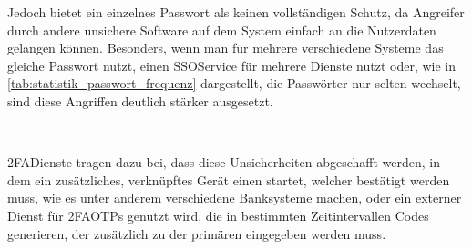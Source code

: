 Jedoch bietet ein einzelnes Passwort als  keinen vollständigen Schutz\autocite[\vglf][]{10.1145/3440712},  da Angreifer \zb durch andere unsichere Software auf dem System einfach an die Nutzerdaten gelangen können.
Besonders, wenn man für mehrere verschiedene Systeme das gleiche Passwort nutzt, einen \ac{SSO}\nonbreakdash Service für mehrere Dienste nutzt oder, wie in \autoref{tab:statistik_passwort_frequenz}\autocite{statista-passwort-reset} dargestellt, die Passwörter nur selten wechselt, sind diese Angriffen deutlich stärker ausgesetzt.

\begin{table}[htpb]
    \caption[Statistik zur Frequenz, in der Nutzer ihre Passwörter wechseln]{Statistik zur Frequenz, in der Nutzer ihre Passwörter wechseln\footnotemark\newline
    \small{Details: Weltweit; 2022; >2000 Befragte}}
    \label{tab:statistik_passwort_frequenz}
\end{table}\ 

\ac{2FA}\nonbreakdash Dienste tragen dazu bei, dass diese Unsicherheiten abgeschafft werden, in dem \zb ein zusätzliches, verknüpftes Gerät einen  startet, welcher bestätigt werden muss,  wie es unter anderem verschiedene Banksysteme machen, oder ein externer Dienst für \ac{2FA}\nonbreakdash \acp{OTP} genutzt wird, die in bestimmten Zeitintervallen Codes generieren, der zusätzlich zu der primären  eingegeben werden muss.